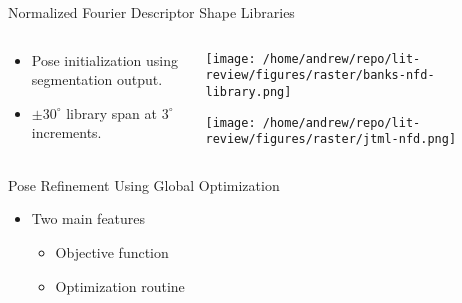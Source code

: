 \documentclass[presentation, aspectratio=1610]{beamer}
\begin{document}
\begin{frame}[label={sec:orgf922f1c}]{Normalized Fourier Descriptor Shape Libraries}
\begin{columns}
\begin{column}{0.37\columnwidth}
\begin{itemize}
\item Pose initialization using segmentation output.
\item \(\pm 30^{\circ}\) library span at \(3^{\circ}\) increments.
\end{itemize}
\end{column}

\begin{column}{0.7\columnwidth}
\begin{center}
\texttt{[image: /home/andrew/repo/lit-review/figures/raster/banks-nfd-library.png]}
\end{center}
\begin{center}
\texttt{[image: /home/andrew/repo/lit-review/figures/raster/jtml-nfd.png]}
\end{center}
\end{column}
\end{columns}
\end{frame}
\begin{frame}[label={sec:org10e9e22}]{Pose Refinement Using Global Optimization}
\begin{itemize}
\item Two main features
\begin{itemize}
\item Objective function
\item Optimization routine
\end{itemize}
\end{itemize}
\end{frame}
\end{document}
